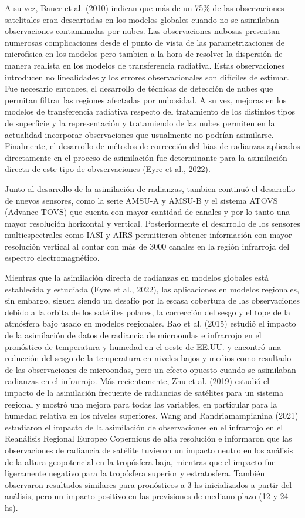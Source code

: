 \documentclass[12pt,oneside,a4paper]{reedthesis}
\begin{document}
A su vez, Bauer et al. (2010) indican que más de un 75\% de las observaciones satelitales eran descartadas en los modelos globales cuando no se asimilaban observaciones contaminadas por nubes. Las observaciones nubosas presentan numerosas complicaciones desde el punto de vista de las parametrizaciones de microfisica en los modelos pero tambien a la hora de resolver la dispersión de manera realista en los modelos de transferencia radiativa. Estas observaciones introducen no linealidades y los errores observacionales son difíciles de estimar. Fue necesario entonces, el desarrollo de técnicas de detección de nubes que permitan filtrar las regiones afectadas por nubosidad. A su vez, mejoras en los modelos de transferencia radiativa respecto del tratamiento de los distintos tipos de superficie y la representación y tratamiendo de las nubes permiten en la actualidad incorporar observaciones que usualmente no podrían asimilarse. Finalmente, el desarrollo de métodos de corrección del bias de radianzas aplicados directamente en el proceso de asimilación fue determinante para la asimilación directa de este tipo de obvservaciones (Eyre et al., 2022).

Junto al desarrollo de la asimilación de radianzas, tambien continuó el desarrollo de nuevos sensores, como la serie AMSU-A y AMSU-B y el sistema ATOVS (Advance TOVS) que cuenta con mayor cantidad de canales y por lo tanto una mayor resolución horizontal y vertical. Posteriormente el desarrollo de los sensores multiespectrales como IASI y AIRS permitieron obtener información con mayor resolución vertical al contar con más de 3000 canales en la región infrarroja del espectro electromagnético.

Mientras que la asimilación directa de radianzas en modelos globales está establecida y estudiada (Eyre et al., 2022), las aplicaciones en modelos regionales, sin embargo, siguen siendo un desafío por la escasa cobertura de las observaciones debido a la orbita de los satélites polares, la corrección del sesgo y el tope de la atmósfera bajo usado en modelos regionales. Bao et al. (2015) estudió el impacto de la asimilación de datos de radiancia de microondas e infrarrojo en el pronóstico de temperatura y humedad en el oeste de EE.UU. y encontró una reducción del sesgo de la temperatura en niveles bajos y medios como resultado de las observaciones de microondas, pero un efecto opuesto cuando se asimilaban radianzas en el infrarrojo. Más recientemente, Zhu et al. (2019) estudió el impacto de la asimilación frecuente de radiancias de satélites para un sistema regional y mostró una mejora para todas las variables, en particular para la humedad relativa en los niveles superiores. Wang and Randriamampianina (2021) estudiaron el impacto de la asimilación de observaciones en el infrarrojo en el Reanálisis Regional Europeo Copernicus de alta resolución e informaron que las observaciones de radiancia de satélite tuvieron un impacto neutro en los análisis de la altura geopotencial en la tropósfera baja, mientras que el impacto fue ligeramente negativo para la tropósfera superior y estratosfera. También observaron resultados similares para pronósticos a 3 hs inicializados a partir del análisis, pero un impacto positivo en las previsiones de mediano plazo (12 y 24 hs).
\end{document}
